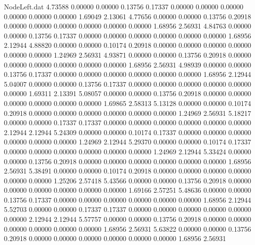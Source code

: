 \begin{filecontents}{NodeLeft.dat}
   4.73588    0.00000    0.00000     0.13756    0.17337    0.00000    0.00000    0.00000    0.00000    0.00000    0.00000    1.69049    2.13061
   4.77656    0.00000    0.00000     0.13756    0.20918    0.00000    0.00000    0.00000    0.00000    0.00000    0.00000    1.68956    2.56931
   4.84763    0.00000    0.00000     0.13756    0.17337    0.00000    0.00000    0.00000    0.00000    0.00000    0.00000    1.68956    2.12944
   4.88820    0.00000    0.00000     0.10174    0.20918    0.00000    0.00000    0.00000    0.00000    0.00000    0.00000    1.24969    2.56931
   4.93871    0.00000    0.00000     0.13756    0.20918    0.00000    0.00000    0.00000    0.00000    0.00000    0.00000    1.68956    2.56931
   4.98939    0.00000    0.00000     0.13756    0.17337    0.00000    0.00000    0.00000    0.00000    0.00000    0.00000    1.68956    2.12944
   5.04007    0.00000    0.00000     0.13756    0.17337    0.00000    0.00000    0.00000    0.00000    0.00000    0.00000    1.69311    2.13391
   5.08057    0.00000    0.00000     0.13756    0.20918    0.00000    0.00000    0.00000    0.00000    0.00000    0.00000    1.69865    2.58313
   5.13128    0.00000    0.00000     0.10174    0.20918    0.00000    0.00000    0.00000    0.00000    0.00000    0.00000    1.24969    2.56931
   5.18217    0.00000    0.00000     0.17337    0.17337    0.00000    0.00000    0.00000    0.00000    0.00000    0.00000    2.12944    2.12944
   5.24309    0.00000    0.00000     0.10174    0.17337    0.00000    0.00000    0.00000    0.00000    0.00000    0.00000    1.24969    2.12944
   5.29370    0.00000    0.00000     0.10174    0.17337    0.00000    0.00000    0.00000    0.00000    0.00000    0.00000    1.24969    2.12944
   5.33424    0.00000    0.00000     0.13756    0.20918    0.00000    0.00000    0.00000    0.00000    0.00000    0.00000    1.68956    2.56931
   5.38491    0.00000    0.00000     0.10174    0.20918    0.00000    0.00000    0.00000    0.00000    0.00000    0.00000    1.25206    2.57418
   5.43566    0.00000    0.00000     0.13756    0.20918    0.00000    0.00000    0.00000    0.00000    0.00000    0.00000    1.69166    2.57251
   5.48636    0.00000    0.00000     0.13756    0.17337    0.00000    0.00000    0.00000    0.00000    0.00000    0.00000    1.68956    2.12944
   5.52703    0.00000    0.00000     0.17337    0.17337    0.00000    0.00000    0.00000    0.00000    0.00000    0.00000    2.12944    2.12944
   5.57757    0.00000    0.00000     0.13756    0.20918    0.00000    0.00000    0.00000    0.00000    0.00000    0.00000    1.68956    2.56931
   5.63822    0.00000    0.00000     0.13756    0.20918    0.00000    0.00000    0.00000    0.00000    0.00000    0.00000    1.68956    2.56931

\end{filecontents}
